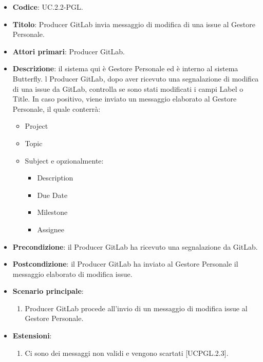 		\begin{itemize}
			\item \textbf{Codice}: UC\theuccount.2.2-PGL.
			\item \textbf{Titolo}: Producer GitLab invia messaggio di modifica di una issue al Gestore Personale.
			\item \textbf{Attori primari}: Producer GitLab.
			\item \textbf{Descrizione}: il sistema qui è Gestore Personale ed è interno al sistema Butterfly. l Producer GitLab, dopo
			aver ricevuto una segnalazione di modifica di una issue da GitLab, controlla se sono stati modificati i campi Label o Title.
			In caso positivo, viene inviato un messaggio elaborato al Gestore Personale, il quale conterrà:
			\begin{itemize}
				\item Project
				\item Topic
				\item Subject e opzionalmente:
				\begin{itemize}
					\item Description
					\item Due Date
					\item Milestone
					\item Assignee
				\end{itemize}
			\end{itemize}
			\item \textbf{Precondizione}: il Producer GitLab ha ricevuto una segnalazione da GitLab.
			\item \textbf{Postcondizione}: il Producer GitLab ha inviato al Gestore Personale il messaggio elaborato di modifica issue.
			\item \textbf{Scenario principale}: 
			\begin{enumerate}
				\item Producer GitLab procede all'invio di un messaggio di modifica issue al Gestore Personale.
			\end{enumerate}
			\item \textbf{Estensioni}: 
			\begin{enumerate}
				\item Ci sono dei messaggi non validi e vengono scartati [UCPGL\theuccount.2.3].
			\end{enumerate}
		\end{itemize}
	
